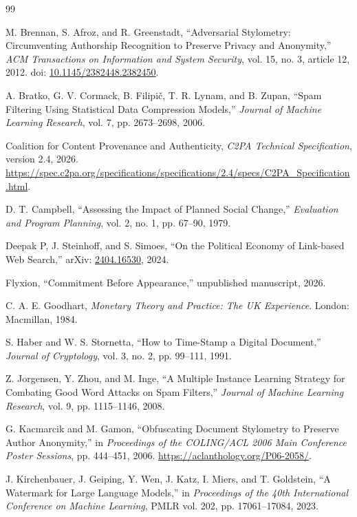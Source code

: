 \documentclass[11pt]{article}
\theoremstyle{plain}
\theoremstyle{definition}
\theoremstyle{remark}
\begin{document}
\begin{thebibliography}{99}

M. Brennan, S. Afroz, and R. Greenstadt,
``Adversarial Stylometry: Circumventing Authorship Recognition to Preserve Privacy and Anonymity,''
\emph{ACM Transactions on Information and System Security}, vol. 15, no. 3, article 12, 2012.
doi: \href{https://doi.org/10.1145/2382448.2382450}{10.1145/2382448.2382450}.

A. Bratko, G. V. Cormack, B. Filipi\v{c}, T. R. Lynam, and B. Zupan,
``Spam Filtering Using Statistical Data Compression Models,''
\emph{Journal of Machine Learning Research}, vol. 7, pp. 2673--2698, 2006.

Coalition for Content Provenance and Authenticity,
\emph{C2PA Technical Specification}, version 2.4, 2026.
\url{https://spec.c2pa.org/specifications/specifications/2.4/specs/C2PA_Specification.html}.

D. T. Campbell,
``Assessing the Impact of Planned Social Change,''
\emph{Evaluation and Program Planning}, vol. 2, no. 1, pp. 67--90, 1979.

Deepak P, J. Steinhoff, and S. Simoes,
``On the Political Economy of Link-based Web Search,''
arXiv: \href{https://arxiv.org/abs/2404.16530}{2404.16530}, 2024.

Flyxion,
``Commitment Before Appearance,'' unpublished manuscript, 2026.

C. A. E. Goodhart,
\emph{Monetary Theory and Practice: The UK Experience}.
London: Macmillan, 1984.

S. Haber and W. S. Stornetta,
``How to Time-Stamp a Digital Document,''
\emph{Journal of Cryptology}, vol. 3, no. 2, pp. 99--111, 1991.

Z. Jorgensen, Y. Zhou, and M. Inge,
``A Multiple Instance Learning Strategy for Combating Good Word Attacks on Spam Filters,''
\emph{Journal of Machine Learning Research}, vol. 9, pp. 1115--1146, 2008.

G. Kacmarcik and M. Gamon,
``Obfuscating Document Stylometry to Preserve Author Anonymity,''
in \emph{Proceedings of the COLING/ACL 2006 Main Conference Poster Sessions}, pp. 444--451, 2006.
\url{https://aclanthology.org/P06-2058/}.

J. Kirchenbauer, J. Geiping, Y. Wen, J. Katz, I. Miers, and T. Goldstein,
``A Watermark for Large Language Models,''
in \emph{Proceedings of the 40th International Conference on Machine Learning}, PMLR vol. 202, pp. 17061--17084, 2023.


\end{thebibliography}
\end{document}
